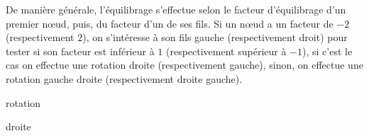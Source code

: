 \documentclass[11pt,a4paper,twoside]{article}
\begin{document}
\begin{center}
\begin{table}[ht!]
\begin{minipage}{0.50\textwidth}

  \end{minipage}
\end{table}

\vspace*{-0.5cm}

\begin{table}[ht!]
  \centering

\colorbox{blanccustom}
{
  \begin{minipage}{0.45\textwidth}
    \raggedright


De manière générale, l'équilibrage s'effectue selon le facteur d'équilibrage d'un premier nœud, puis, du facteur d'un de ses fils.
Si un nœud a un facteur de $ -2 $ (respectivement $ 2 $), on s'intéresse à son fils gauche (respectivement droit) pour tester si son facteur est inférieur à $ 1 $ (respectivement supérieur à $ -1 $), si c'est le cas on effectue une rotation droite (respectivement gauche), sinon, on effectue une rotation gauche droite (respectivement droite gauche).

  \end{minipage}
}
  \hfillx
  \begin{minipage}{0.10\textwidth}
    \centering


\centerline{
rotation
}

\centerline{
droite
}

  \end{minipage}
  \hfillx
  \begin{minipage}{0.40\textwidth}
    \centering


\end{minipage}
\end{table}
\end{center}
\end{document}
